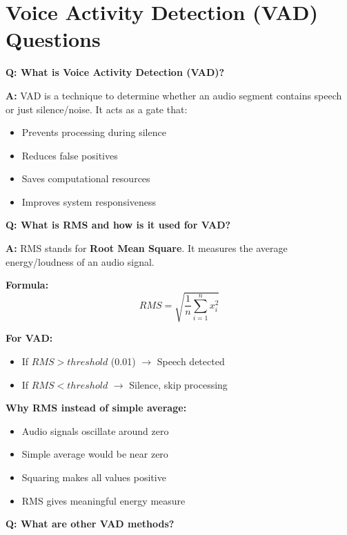 \documentclass[a4paper,12pt]{article}
\newcommand{\vivaQ}[1]{\textcolor{questioncolor}{\textbf{Q: #1}}}
\newcommand{\vivaA}[1]{\textcolor{answercolor}{\textbf{A:}} #1}
\begin{document}
\section{Voice Activity Detection (VAD) Questions}

\vivaQ{What is Voice Activity Detection (VAD)?}

\vivaA{VAD is a technique to determine whether an audio segment contains speech or just silence/noise. It acts as a gate that:
\begin{itemize}
    \item Prevents processing during silence
    \item Reduces false positives
    \item Saves computational resources
    \item Improves system responsiveness
\end{itemize}}

\vspace{0.5cm}

\vivaQ{What is RMS and how is it used for VAD?}

\vivaA{RMS stands for \textbf{Root Mean Square}. It measures the average energy/loudness of an audio signal.

\textbf{Formula:}
\[RMS = \sqrt{\frac{1}{n}\sum_{i=1}^{n} x_i^2}\]

\textbf{For VAD:}
\begin{itemize}
    \item If $RMS > threshold$ (0.01) $\rightarrow$ Speech detected
    \item If $RMS < threshold$ $\rightarrow$ Silence, skip processing
\end{itemize}

\textbf{Why RMS instead of simple average:}
\begin{itemize}
    \item Audio signals oscillate around zero
    \item Simple average would be near zero
    \item Squaring makes all values positive
    \item RMS gives meaningful energy measure
\end{itemize}}

\vspace{0.5cm}

\vivaQ{What are other VAD methods?}
\end{document}

